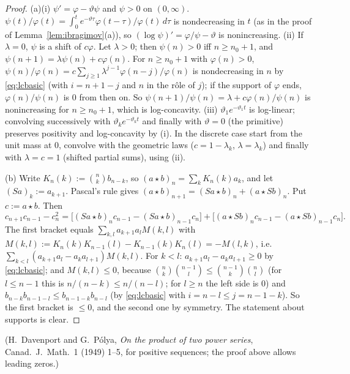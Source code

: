 \documentclass[11pt,a4paper]{article}
\theoremstyle{definition}
\begin{document}
\begin{proof}
(a)(i) $\psi'=\varphi-\vartheta\psi$ and $\psi>0$ on $(0,\infty)$. $\psi(t)/\varphi(t)=\int_0^te^{-\vartheta\tau}\varphi(t-\tau)/\varphi(t)\,d\tau$ is nondecreasing in $t$ (as in the proof of Lemma~\ref{lem:ibragimov}(a)), so $(\log\psi)'=\varphi/\psi-\vartheta$ is nonincreasing.
(ii) If $\lambda=0$, $\psi$ is a shift of $c\varphi$. Let $\lambda>0$; then $\psi(n)>0$ iff $n\ge n_0+1$, and $\psi(n+1)=\lambda\psi(n)+c\varphi(n)$. For $n\ge n_0+1$ with $\varphi(n)>0$, $\psi(n)/\varphi(n)=c\sum_{j\ge1}\lambda^{j-1}\varphi(n-j)/\varphi(n)$ is nondecreasing in $n$ by \eqref{eq:lcbasic} (with $i=n+1-j$ and $n$ in the r\^ole of $j$); if the support of $\varphi$ ends, $\varphi(n)/\psi(n)$ is $0$ from then on. So $\psi(n+1)/\psi(n)=\lambda+c\varphi(n)/\psi(n)$ is nonincreasing for $n\ge n_0+1$, which is log-concavity.
(iii) $\vartheta_1e^{-\vartheta_1t}$ is log-linear; convolving successively with $\vartheta_ke^{-\vartheta_kt}$ and finally with $\vartheta=0$ (the primitive) preserves positivity and log-concavity by (i). In the discrete case start from the unit mass at $0$, convolve with the geometric laws ($c=1-\lambda_k$, $\lambda=\lambda_k$) and finally with $\lambda=c=1$ (shifted partial sums), using (ii).

(b) Write $K_n(k):=\binom nkb_{n-k}$, so $(a\star b)_n=\sum_kK_n(k)a_k$, and let $(Sa)_k:=a_{k+1}$. Pascal's rule gives $(a\star b)_{n+1}=(Sa\star b)_n+(a\star Sb)_n$. Put $c:=a\star b$. Then
\[
c_{n+1}c_{n-1}-c_n^2=\bigl[(Sa\star b)_nc_{n-1}-(Sa\star b)_{n-1}c_n\bigr]+\bigl[(a\star Sb)_nc_{n-1}-(a\star Sb)_{n-1}c_n\bigr].
\]
The first bracket equals $\sum_{k,l}a_{k+1}a_lM(k,l)$ with $M(k,l):=K_n(k)K_{n-1}(l)-K_{n-1}(k)K_n(l)=-M(l,k)$, i.e.\ $\sum_{k<l}(a_{k+1}a_l-a_ka_{l+1})M(k,l)$. For $k<l$: $a_{k+1}a_l-a_ka_{l+1}\ge0$ by \eqref{eq:lcbasic}; and $M(k,l)\le0$, because $\binom nk\binom{n-1}l\le\binom{n-1}k\binom nl$ (for $l\le n-1$ this is $n/(n-k)\le n/(n-l)$; for $l\ge n$ the left side is $0$) and $b_{n-k}b_{n-1-l}\le b_{n-1-k}b_{n-l}$ (by \eqref{eq:lcbasic} with $i=n-l\le j=n-1-k$). So the first bracket is $\le0$, and the second one by symmetry. The statement about supports is clear.
\end{proof}

(H.~Davenport and G.~P\'olya, \emph{On the product of two power series}, Canad.\ J.\ Math.\ 1 (1949) 1--5, for positive sequences; the proof above allows leading zeros.)
\end{document}
